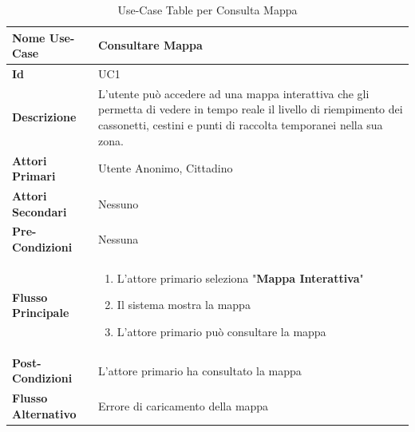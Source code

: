         \begin{table}[h]
            \centering
            \renewcommand{\arraystretch}{1.3} %
            \begin{tabular}{|p{4cm}|p{10cm}|}
                \hline
                \textbf{Nome Use-Case}& \textbf{Consultare Mappa}\\
                \hline
                \textbf{Id} & UC1   \\
                \hline
                \textbf{Descrizione}& L'utente può accedere ad una mappa interattiva che gli permetta di vedere in tempo reale il livello
                                    di riempimento dei cassonetti, cestini e punti di raccolta temporanei nella sua zona.\\
                \hline
                \textbf{Attori Primari}& Utente Anonimo, Cittadino\\
                \hline
                \textbf{Attori Secondari}& Nessuno\\
                \hline
                \textbf{Pre-Condizioni}& Nessuna\\
                \hline
                \textbf{Flusso Principale}& 
                \begin{enumerate}
                    \item L'attore primario seleziona "\textbf{Mappa Interattiva}"
                    \item Il sistema mostra la mappa
                    \item L'attore primario può consultare la mappa
                \end{enumerate}
                \\
                \hline
                \textbf{Post-Condizioni}& L'attore primario ha consultato la mappa\\
                \hline
                \textbf{Flusso Alternativo}& Errore di caricamento della mappa\\
                \hline
            \end{tabular}
            \caption{Use-Case Table per Consulta Mappa}
            \label{tab:use_case}
        \end{table}

